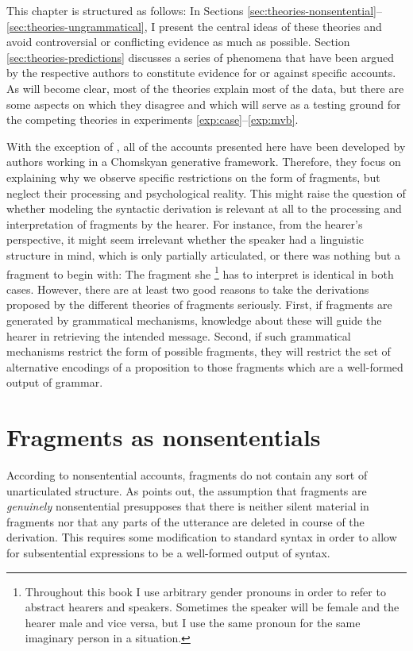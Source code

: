 This chapter is structured as follows: In Sections \ref{sec:theories-nonsentential}--\ref{sec:theories-ungrammatical}, I present the central ideas of these theories and avoid controversial or conflicting evidence as much as possible. Section \ref{sec:theories-predictions} discusses a series of phenomena that have been argued by the respective authors to constitute evidence for or against specific accounts. As will become clear, most of the theories explain most of the data, but there are some aspects on which they disagree and which will serve as a testing ground for the competing theories in experiments \ref{exp:case}--\ref{exp:mvb}.

With the exception of \citet{bergen.goodman2015}, all of the accounts presented here have been developed by authors working in a Chomskyan generative framework. Therefore, they focus on explaining why we observe specific restrictions on the form of fragments, but neglect their processing and psychological reality. This might raise the question of whether modeling the syntactic derivation is relevant at all to the processing and interpretation of fragments by the hearer. For instance, from the hearer's perspective, it might seem irrelevant whether the speaker had a linguistic structure in mind, which is only partially articulated, or there was nothing but a fragment to begin with: The fragment she%
%
\footnote{Throughout this book I use arbitrary gender pronouns in order to refer to abstract hearers and speakers. Sometimes the speaker will be female and the hearer male and vice versa, but I use the same pronoun for the same imaginary person in a situation.}\afterfn%
% 
has to interpret is identical in both cases. However, there are at least two good reasons to take the derivations proposed by the different theories of fragments seriously. First, if fragments are generated by grammatical mechanisms, knowledge about these will guide the hearer in retrieving the intended message. Second, if such grammatical mechanisms restrict the form of possible fragments, they will restrict the set of alternative encodings of a proposition to those fragments which are a well-formed output of grammar.

\section{Fragments as nonsententials}
\label{sec:theories-nonsentential}
According to nonsentential accounts, fragments do not contain any sort of unarti\-culated structure. As \citet{stainton2006} points out, the assumption that fragments are \textit{genuinely} nonsentential presupposes that there is neither silent material in fragments nor that any parts of the utterance are deleted in course of the derivation. This requires some modification to standard syntax in order to allow for subsentential expressions to be a well-formed output of syntax.

